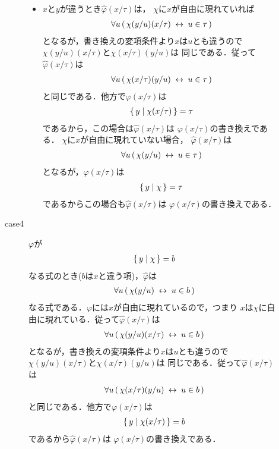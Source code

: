 \begin{metaprf}
\begin{description}
\begin{description}
\begin{itemize}
							\item $x$と$y$が違うとき$\widehat{\varphi}(x/\tau)$は，
								$\chi$に$x$が自由に現れていれば
								\begin{align}
									\forall u\, (\, \chi(y/u)(x/\tau) \hspace{0.25em}\leftrightarrow\hspace{0.25em} u \in \tau\, )
								\end{align}
								となるが，書き換えの変項条件より$x$は$u$とも違うので
								$\chi(y/u)(x/\tau)$と$\chi(x/\tau)(y/u)$は
								同じである．従って$\widehat{\varphi}(x/\tau)$は
								\begin{align}
									\forall u\, (\, \chi(x/\tau)(y/u) \hspace{0.25em}\leftrightarrow\hspace{0.25em} u \in \tau\, )
								\end{align}
								と同じである．他方で$\varphi(x/\tau)$は
								\begin{align}
									\{\, y \mid \chi(x/\tau)\, \} = \tau
								\end{align}
								であるから，この場合は$\widehat{\varphi}(x/\tau)$は
								$\varphi(x/\tau)$の書き換えである．
								$\chi$に$x$が自由に現れていない場合，
								$\widehat{\varphi}(x/\tau)$は
								\begin{align}
									\forall u\, (\, \chi(y/u) \hspace{0.25em}\leftrightarrow\hspace{0.25em} u \in \tau\, )
								\end{align}
								となるが，$\varphi(x/\tau)$は
								\begin{align}
									\{\, y \mid \chi\, \} = \tau
								\end{align}
								であるからこの場合も$\widehat{\varphi}(x/\tau)$は
								$\varphi(x/\tau)$の書き換えである．
						\end{itemize}
						
					\item[case4] $\varphi$が
						\begin{align}
							\{\, y \mid \chi\, \} = b
						\end{align}
						なる式のとき($b$は$x$と違う項)，$\widehat{\varphi}$は
						\begin{align}
							\forall u\, (\, \chi(y/u) \hspace{0.25em}\leftrightarrow\hspace{0.25em} u \in b\, )
						\end{align}
						なる式である．$\varphi$には$x$が自由に現れているので，つまり
						$x$は$\chi$に自由に現れている．従って$\widehat{\varphi}(x/\tau)$は
						\begin{align}
							\forall u\, (\, \chi(y/u)(x/\tau) \hspace{0.25em}\leftrightarrow\hspace{0.25em} u \in b\, )
						\end{align}
						となるが，書き換えの変項条件より$x$は$u$とも違うので
						$\chi(y/u)(x/\tau)$と$\chi(x/\tau)(y/u)$は
						同じである．従って$\widehat{\varphi}(x/\tau)$は
						\begin{align}
							\forall u\, (\, \chi(x/\tau)(y/u) \hspace{0.25em}\leftrightarrow\hspace{0.25em} u \in b\, )
						\end{align}
						と同じである．他方で$\varphi(x/\tau)$は
						\begin{align}
							\{\, y \mid \chi(x/\tau)\, \} = b
						\end{align}
						であるから$\widehat{\varphi}(x/\tau)$は
						$\varphi(x/\tau)$の書き換えである．
					

\end{description}
\end{description}
\end{metaprf}
